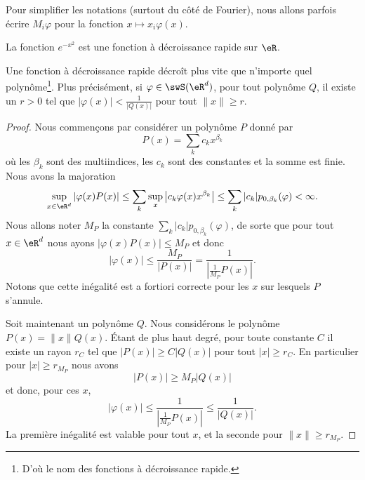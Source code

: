 Pour simplifier les notations (surtout du côté de Fourier), nous allons parfois écrire \( M_i\varphi\) pour la fonction \( x\mapsto x_i\varphi(x)\).

\begin{example}
    La fonction \(  e^{-x^2}\) est une fonction à décroissance rapide sur \( \eR\).
\end{example}

\begin{proposition} \label{PropCSmzwGv}
    Une fonction à décroissance rapide décroît plus vite que n'importe quel polynôme\footnote{D'où le nom des fonctions à décroissance rapide.}. Plus précisément, si \( \varphi\in\swS(\eR^d)\), pour tout polynôme \( Q\), il existe un \( r>0\) tel que \(  | \varphi(x) |<\frac{1}{ | Q(x) | } \) pour tout \( \| x \|\geq r\).
\end{proposition}

\begin{proof}
    Nous commençons par considérer un polynôme \( P\) donné par
    \begin{equation}
        P(x)=\sum_kc_kx^{\beta_k}
    \end{equation}
    où les \( \beta_k\) sont des multiindices, les \( c_k\) sont des constantes et la somme est finie. Nous avons la majoration
    \begin{equation}
        \sup_{x\in \eR^d}| \varphi(x)P(x) |\leq\sum_k\sup_x\big| c_k\varphi(x) x^{\beta_k} \big|\leq\sum_k| c_k |p_{0,\beta_k}(\varphi)<\infty.
    \end{equation}
    Nous allons noter \( M_P\) la constante \( \sum_k| c_k |p_{0,\beta_k}(\varphi)\), de sorte que pour tout \( x\in \eR^d\) nous ayons \( | \varphi(x)P(x) |\leq M_P\) et donc
    \begin{equation}
        | \varphi(x) |\leq \frac{ M_P }{ | P(x) | }=\frac{1}{ | \frac{1}{ M_P }P(x) | }.
    \end{equation}
    Notons que cette inégalité est a fortiori correcte pour les \( x\) sur lesquels \( P\) s'annule.

    Soit maintenant un polynôme \( Q\). Nous considérons le polynôme \( P(x)=\| x \|Q(x)\). Étant de plus haut degré, pour toute constante \( C\) il existe un rayon \( r_C\) tel que \( | P(x) |\geq C| Q(x) |\) pour tout \( | x |\geq r_C\). En particulier pour \( | x |\geq r_{M_P}\) nous avons
    \begin{equation}
        | P(x) |\geq M_P| Q(x) |
    \end{equation}
    et donc, pour ces \( x\), 
    \begin{equation}
        | \varphi(x) |\leq \frac{1}{ | \frac{1}{ M_P }P(x) | }\leq \frac{1}{ | Q(x) | }.
    \end{equation}
    La première inégalité est valable pour tout \( x\), et la seconde pour \( \| x \|\geq r_{M_P}\).
\end{proof}


